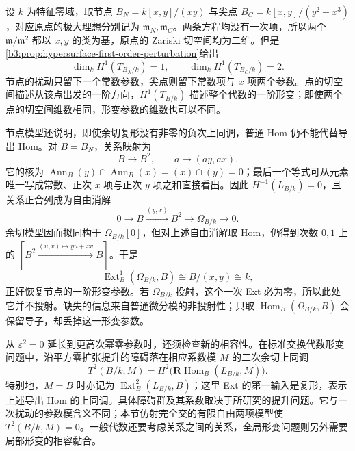 \begin{example}\label{b3:exm:cusp-tangent-complex}
	设 \(k\) 为特征零域，取节点 \(B_N=k[x,y]/(xy)\) 与尖点 \(B_C=k[x,y]/(y^2-x^3)\)，对应原点的极大理想分别记为 \(\mathfrak m_N,\mathfrak m_C\)。两条方程均没有一次项，所以两个 \(\mathfrak m/\mathfrak m^2\) 都以 \(x,y\) 的类为基，原点的 Zariski 切空间均为二维。但是\cref{b3:prop:hypersurface-first-order-perturbation}给出
	\[
		\dim_k H^1(T_{B_N/k})=1,\qquad \dim_k H^1(T_{B_C/k})=2.
	\]
	节点的扰动只留下一个常数参数，尖点则留下常数项与 \(x\) 项两个参数。点的切空间描述从该点出发的一阶方向，\(H^1(T_{B/k})\) 描述整个代数的一阶形变；即使两个点的切空间维数相同，形变参数的维数也可以不同。

	\ProseParagraphBreak
	节点模型还说明，即使余切复形没有非零的负次上同调，普通 Hom 仍不能代替导出 Hom。对 \(B=B_N\)，关系映射为
	\[
		B\longrightarrow B^2,\qquad a\longmapsto(ay,ax).
	\]
	它的核为 \(\operatorname{Ann}_B(y)\cap\operatorname{Ann}_B(x)=(x)\cap(y)=0\)；最后一个等式可从元素唯一写成常数、正次 \(x\) 项与正次 \(y\) 项之和直接看出。因此 \(H^{-1}(L_{B/k})=0\)，且关系正合列成为自由消解
	\[
		0\longrightarrow B\xrightarrow{(y,x)}B^2 \longrightarrow\Omega_{B/k}\longrightarrow0.
	\]
	余切模型因而拟同构于 \(\Omega_{B/k}[0]\)，但对上述自由消解取 Hom，仍得到次数 \(0,1\) 上的 \([B^2\xrightarrow{(u,v)\mapsto yu+xv}B]\)。于是
	\[
		\operatorname{Ext}_B^1(\Omega_{B/k},B) \cong B/(x,y)\cong k,
	\]
	正好恢复节点的一阶形变参数。若 \(\Omega_{B/k}\) 投射，这个一次 Ext 必为零，所以此处它并不投射。缺失的信息来自普通微分模的非投射性；只取 \(\operatorname{Hom}_B(\Omega_{B/k},B)\) 会保留导子，却丢掉这一形变参数。
\end{example}

从 \(\varepsilon^2=0\) 延长到更高次幂零参数时，还须检查新的相容性。在标准交换代数形变问题中，沿平方零扩张提升的障碍落在相应系数模 \(M\) 的二次余切上同调
\[
	T^2(B/k,M)=H^2\bigl(\mathbf R\operatorname{Hom}_B(L_{B/k},M)\bigr).
\]
特别地，\(M=B\) 时亦记为 \(\operatorname{Ext}_B^2(L_{B/k},B)\)；这里 Ext 的第一输入是复形，表示上述导出 Hom 的上同调。具体障碍群及其系数取决于所研究的提升问题。它与一次扰动的参数模含义不同；本节仿射完全交的有限自由两项模型使 \(T^2(B/k,M)=0\)。一般代数还要考虑关系之间的关系，全局形变问题则另外需要局部形变的相容黏合。
